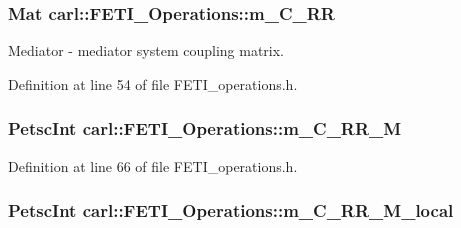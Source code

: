 \subsubsection[{m\+\_\+\+C\+\_\+\+R\+R}]{\setlength{\rightskip}{0pt plus 5cm}Mat carl\+::\+F\+E\+T\+I\+\_\+\+Operations\+::m\+\_\+\+C\+\_\+\+R\+R\hspace{0.3cm}{\ttfamily [protected]}}\label{classcarl_1_1_f_e_t_i___operations_abd5d326b088db98b2fbe6f2c8cbab5bc}


Mediator -\/ mediator system coupling matrix. 



Definition at line 54 of file F\+E\+T\+I\+\_\+operations.\+h.

\hypertarget{classcarl_1_1_f_e_t_i___operations_a8212c6fec9ded9faeb36cc3ce18f2e35}{}
\subsubsection[{m\+\_\+\+C\+\_\+\+R\+R\+\_\+\+M}]{\setlength{\rightskip}{0pt plus 5cm}Petsc\+Int carl\+::\+F\+E\+T\+I\+\_\+\+Operations\+::m\+\_\+\+C\+\_\+\+R\+R\+\_\+\+M\hspace{0.3cm}{\ttfamily [protected]}}\label{classcarl_1_1_f_e_t_i___operations_a8212c6fec9ded9faeb36cc3ce18f2e35}


Definition at line 66 of file F\+E\+T\+I\+\_\+operations.\+h.

\hypertarget{classcarl_1_1_f_e_t_i___operations_a2401278970b5cc7087ebbf1746c64d35}{}
\subsubsection[{m\+\_\+\+C\+\_\+\+R\+R\+\_\+\+M\+\_\+local}]{\setlength{\rightskip}{0pt plus 5cm}Petsc\+Int carl\+::\+F\+E\+T\+I\+\_\+\+Operations\+::m\+\_\+\+C\+\_\+\+R\+R\+\_\+\+M\+\_\+local\hspace{0.3cm}{\ttfamily [protected]}}\label{classcarl_1_1_f_e_t_i___operations_a2401278970b5cc7087ebbf1746c64d35}


